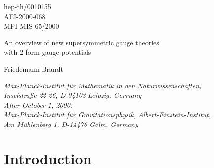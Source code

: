 \documentclass[a4paper,12pt]{article}
\begin{document}
\begin{flushright}
hep-th/0010155
\\
AEI-2000-068
\\
MPI-MIS-65/2000
\end{flushright}

\vspace{.5cm}

\begin{center}
{\Large
An overview of new supersymmetric gauge theories\\ 
with 2-form gauge potentials
}
\end{center}

\begin{center}
Friedemann Brandt
\end{center}

\begin{center}
{\sl Max-Planck-Institut f\"ur Mathematik in den 
Natur\-wissen\-schaf\-ten,\\
Inselstra\ss e 22-26, D-04103 Leipzig, Germany\\
After October 1, 2000:\\
Max-Planck-Institut
f\"ur Gravitationsphysik, Albert-Einstein-In\-sti\-tut,\\ 
Am M\"uhlenberg 1, D-14476 Golm, Germany
}
\end{center}

\begin{abstract}
An overview of new 4d supersymmetric gauge 
theories with 2-form gauge potentials constructed by various 
authors during the past five years is given. The key r\^ole
of three particular types of interaction vertices is emphasized.
These vertices are used to develop a connecting perspective on 
the new models and to distinguish between them. 
One example is presented in detail to illustrate
characteristic features of the models. A new result
on couplings of 2-form gauge potentials to Chern-Simons 
forms is presented.
\end{abstract}

\section{Introduction}
\end{document}
